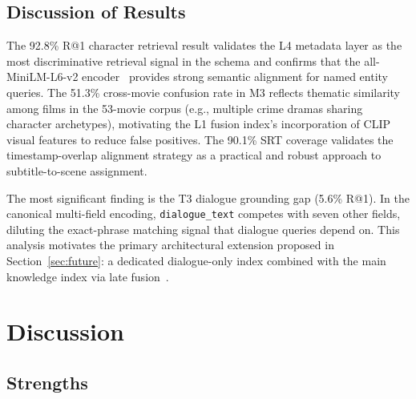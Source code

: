 \documentclass[11pt]{article}
\begin{document}
\subsection{Discussion of Results}

The 92.8\% R@1 character retrieval result validates the L4 metadata layer as
the most discriminative retrieval signal in the schema and confirms that the
all-MiniLM-L6-v2 encoder~\cite{sbert} provides strong semantic alignment for
named entity queries.  The 51.3\% cross-movie confusion rate in M3 reflects
thematic similarity among films in the 53-movie corpus (e.g., multiple crime
dramas sharing character archetypes), motivating the L1 fusion index's
incorporation of CLIP visual features to reduce false positives.  The 90.1\%
SRT coverage validates the timestamp-overlap alignment strategy as a practical
and robust approach to subtitle-to-scene assignment.

The most significant finding is the T3 dialogue grounding gap (5.6\% R@1).
In the canonical multi-field encoding, \texttt{dialogue\_text} competes with
seven other fields, diluting the exact-phrase matching signal that dialogue
queries depend on.  This analysis motivates the primary architectural extension
proposed in Section~\ref{sec:future}: a dedicated dialogue-only index combined
with the main knowledge index via late fusion~\cite{colbert,dpr}.

\section{Discussion}
\label{sec:discussion}

\subsection{Strengths}
\end{document}

